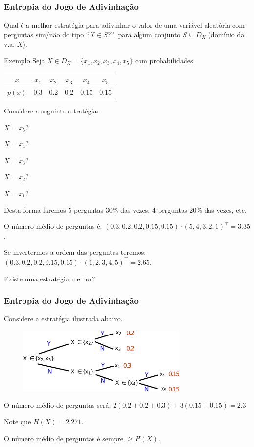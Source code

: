 \begin{frame}%
  \frametitle{Entropia do Jogo de Adivinhação}
  Qual é a melhor estratégia para adivinhar o valor de uma variável aleatória
  com perguntas sim/não do tipo ``$X\in S$?'', para algum conjunto $S \subseteq D_X$
  (domínio da v.a. $X$).

  \begin{exampleblock}{Exemplo \citep{bilmes2013}}
    Seja $X \in D_X = \{x_1, x_2, x_3, x_4, x_5\}$ com probabilidades
        \begin{tabular}{ c | c c c c c}
          $x$    & $x_1$ & $x_2$ & $x_3$ & $x_4$ & $x_5$ \\ \hline
          $p(x)$ & 0.3   & 0.2   & 0.2   & 0.15  & 0.15 \\
        \end{tabular}

    Considere a seguinte estratégia: 
    \begin{inlineenumerate}
        \item $X = x_5$? 
        \item $X = x_4$?
        \item $X = x_3$?
        \item $X = x_2$?
        \item $X = x_1$?
    \end{inlineenumerate}

    Desta forma faremos 5 perguntas 30\% das vezes, 4 perguntas 20\% das vezes, etc.

    O número médio de perguntas é:
    $(0.3, 0.2, 0.2, 0.15, 0.15) \cdot (5,4,3,2,1)^\intercal = 3.35$.

    Se invertermos a ordem das perguntas teremos:
    $(0.3, 0.2, 0.2, 0.15, 0.15) \cdot (1,2,3,4,5)^\intercal = 2.65$.

    Existe uma estratégia melhor?
  \end{exampleblock}
\end{frame}

\begin{frame}%
  \frametitle{Entropia do Jogo de Adivinhação}

  Considere a estratégia ilustrada abaixo.
  \begin{figure}[h!]
  \centering
  \includegraphics[width=0.75\textwidth]{images/ex-jogo-ad.pdf}
  \label{fig:ex-jogo-ad}
  \end{figure} 

  O número médio de perguntas será:
  $2(0.2 + 0.2 + 0.3) + 3 (0.15 + 0.15) = 2.3$

  Note que $H(X) = 2.271$.

  O número médio de perguntas é sempre $\geq H(X)$.
\end{frame}

